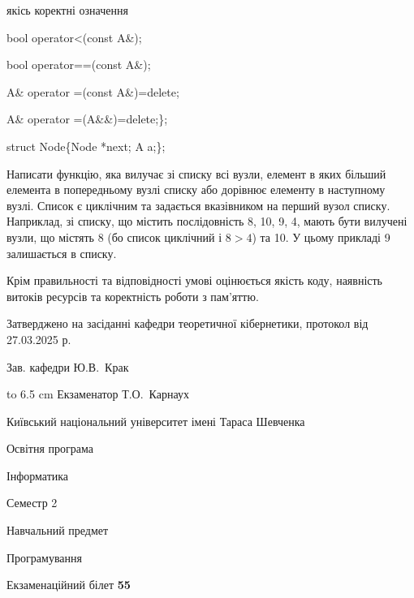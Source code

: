 \documentclass[12pt, ukrainian]{article}
\begin{document}
{\quad  якісь коректні означення 

\quad  bool operator<(const A\&); 

\quad  bool operator==(const A\&); 

\quad A\& operator =(const A\&)=delete; 

\quad  A\& operator =(A\&\&)=delete;\};

struct Node\{Node *next; A a;\};

 Написати функцію, яка вилучає зі списку всі вузли, елемент в яких більший елемента в попередньому вузлі списку або дорівнює елементу в наступному вузлі. Список є циклічним та задається вказівником на перший вузол списку. Наприклад, зі списку, що містить послідовність 8, 10, 9, 4, мають бути вилучені вузли, що містять 8 (бо список циклічний і $8>4$) та 10. У цьому прикладі 9 залишається в списку.

Крім правильності та відповідності умові оцінюється якість коду, наявність витоків ресурсів та коректність роботи з пам'яттю. 

}
{\smallskip\smallskip \begin {scriptsize} Затверджено на засіданні кафедри теоретичної кібернетики, протокол   від   27.03.2025 р.\par\smallskip\smallskip\smallskip\smallskip
{\parbox {6.5 cm} {Зав. кафедри \dotfill Ю.В.~Крак}}\hspace {0.7cm} {\hbox to 6.5 cm { Екзаменатор \dotfill Т.О.~Карнаух}} \end{scriptsize}}
\newpage
{{\begin {scriptsize}\par
{ \center  Київський національний університет імені Тараса Шевченка \par}
{\parbox {5 cm}{Освітня програма \hfill}{\parbox {7 cm}{Інформатика\hfill}}\parbox {6 cm}{\hfill Семестр 2}}\par
{\parbox {5 cm} {Навчальний предмет \hfill}\parbox {7 cm}{Програмування \hfill}\parbox {6cm}{\hfill}\par}\vspace{-15pt} \end{scriptsize}}{\center Екзаменаційний білет \No \textbf { 55 }\par}}
\end{document}
